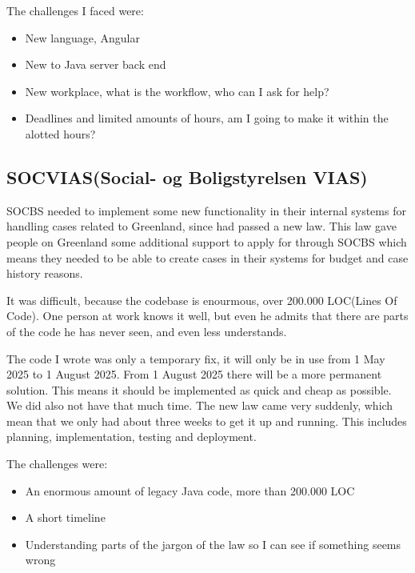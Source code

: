 \documentclass[../main.tex]{subfiles}
\begin{document}
The challenges I faced were:
\begin{itemize}
    \item New language, Angular
    \item New to Java server back end
    \item New workplace, what is the workflow, who can I ask for help?
    \item Deadlines and limited amounts of hours, am I going to make it within the alotted hours?
\end{itemize}



\subsection{SOCVIAS(Social- og Boligstyrelsen VIAS)}
SOCBS needed to implement some new functionality in their internal systems for handling cases related to Greenland, since  had passed a new law. This law gave people on Greenland some additional support to apply for through SOCBS which means they needed to be able to create cases in their systems for budget and case history reasons. 

It was difficult, because the codebase is enourmous, over 200.000 LOC(Lines Of Code). One person at work knows it well, but even he admits that there are parts of the code he has never seen, and even less understands.

The code I wrote was only a temporary fix, it will only be in use from 1 May 2025 to 1 August 2025. From 1 August 2025 there will be a more permanent solution. This means it should be implemented as quick and cheap as possible. We did also not have that much time. The new law came very suddenly, which mean that we only had about three weeks to get it up and running. This includes planning, implementation, testing and deployment.

The challenges were:
\begin{itemize}
    \item An enormous amount of legacy Java code, more than 200.000 LOC
    \item A short timeline
    \item Understanding parts of the jargon of the law so I can see if something seems wrong
\end{itemize}

\end{document}
